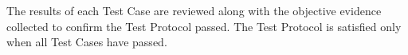 The results of each Test Case are reviewed along with the objective evidence
collected to confirm the Test Protocol passed.  The Test Protocol is satisfied
only when all Test Cases have passed.
